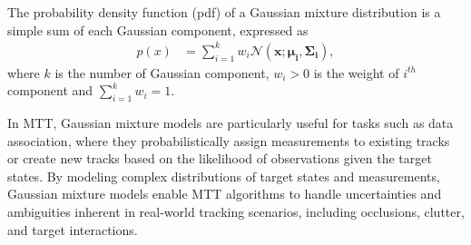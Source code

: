 The probability density function (pdf) of a Gaussian mixture distribution is a simple sum of each Gaussian component, expressed as
    \begin{align}
        p(x) &= \sum_{i=1}^k w_i\mathcal{N}(\mathbf{x};\mathbf{\mu_i}, \mathbf{\Sigma_i}),
    \end{align}
where $k$ is the number of Gaussian component, $w_i>0$ is the weight of $i^{th}$ component and $\sum_{i=1}^k w_i = 1$.

In MTT, Gaussian mixture models are particularly useful for tasks such as data association, where they probabilistically assign measurements to existing tracks or create new tracks based on the likelihood of observations given the target states. By modeling complex distributions of target states and measurements, Gaussian mixture models enable MTT algorithms to handle uncertainties and ambiguities inherent in real-world tracking scenarios, including occlusions, clutter, and target interactions.

